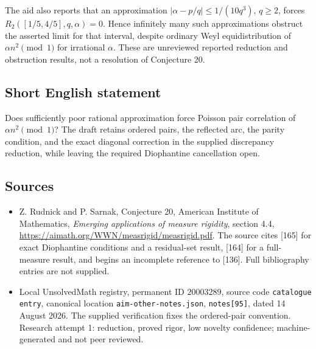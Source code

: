\documentclass[11pt]{article}
\begin{document}
The aid also reports that an approximation $|\alpha-p/q|\le1/(10q^3)$, $q\ge2$, forces $R_2([1/5,4/5],q,\alpha)=0$. Hence infinitely many such approximations obstruct the asserted limit for that interval, despite ordinary Weyl equidistribution of $\alpha n^2\pmod1$ for irrational $\alpha$. These are unreviewed reported reduction and obstruction results, not a resolution of Conjecture 20.
\subsection{Short English statement}
Does sufficiently poor rational approximation force Poisson pair correlation of $\alpha n^2\pmod1$? The draft retains ordered pairs, the reflected arc, the parity condition, and the exact diagonal correction in the supplied discrepancy reduction, while leaving the required Diophantine cancellation open.
\subsection{Sources}
\begin{itemize}
\item Z. Rudnick and P. Sarnak, Conjecture 20, American Institute of Mathematics, \emph{Emerging applications of measure rigidity}, section 4.4, \url{https://aimath.org/WWN/measrigid/measrigid.pdf}. The source cites [165] for exact Diophantine conditions and a residual-set result, [164] for a full-measure result, and begins an incomplete reference to [136]. Full bibliography entries are not supplied.
\item Local UnsolvedMath registry, permanent ID $20003289$, source code \texttt{catalogue entry}, canonical location \texttt{aim-other-notes.json}, \texttt{notes[95]}, dated 14 August 2026. The supplied verification fixes the ordered-pair convention. Research attempt 1: reduction, proved rigor, low novelty confidence; machine-generated and not peer reviewed.
\end{itemize}
\end{document}
